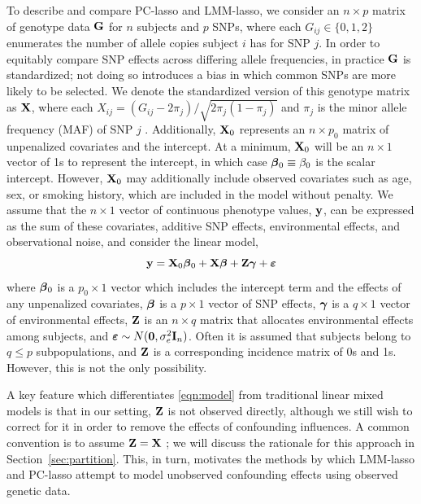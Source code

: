 To describe and compare PC-lasso and LMM-lasso, we consider an $n \times p$ matrix of genotype data $\mathbf{G}$ for $n$ subjects and $p$ SNPs, where each $G_{ij} \in \{ 0, 1, 2 \}$ enumerates the number of allele copies subject $i$ has for SNP $j$. In order to equitably compare SNP effects across differing allele frequencies, in practice $\mathbf{G}$ is standardized; not doing so introduces a bias in which common SNPs are more likely to be selected. We denote the standardized version of this genotype matrix as $\mathbf{X}$, where each $X_{ij} = (G_{ij} - 2 \pi_j) / \sqrt{2\pi_j (1 - \pi_j)}$ and $\pi_j$ is the minor allele frequency (MAF) of SNP $j$ \citep{zhang2015principal, price2006principal}. Additionally, $\mathbf{X}_0$ represents an $n \times p_0$ matrix of unpenalized covariates and the intercept. At a minimum, $\mathbf{X}_0$ will be an $n \times 1$ vector of 1s to represent the intercept, in which case $\boldsymbol{\beta}{}_0 \equiv \beta_0$ is the scalar intercept. However, $\mathbf{X}_0$ may additionally include observed covariates such as age, sex, or smoking history, which are included in the model without penalty. We assume that the $n \times 1$ vector of continuous phenotype values, $\mathbf{y}$, can be expressed as the sum of these covariates, additive SNP effects, environmental effects, and observational noise, and consider the linear model,
\begin{equation}
    \label{eqn:model}
    \mathbf{y} = \mathbf{X}_0 \boldsymbol{\beta}{}_0 + \mathbf{X}\boldsymbol{\beta}{} + \mathbf{Z}\boldsymbol{\gamma} + \boldsymbol{\varepsilon}{}
\end{equation}
where $\boldsymbol{\beta}{}_0$ is a $p_0 \times 1$ vector which includes the intercept term and the effects of any unpenalized covariates, $\boldsymbol{\beta}{}$ is a $p \times 1$ vector of SNP effects, $\boldsymbol{\gamma}$ is a $q \times 1$ vector of environmental effects, $\mathbf{Z}$ is an $n \times q$ matrix that allocates environmental effects among subjects, and $\boldsymbol{\varepsilon}{} \sim N(\boldsymbol{0}, \sigma^2_e \mathbf{I}_n)$. Often it is assumed that subjects belong to $q \le p$ subpopulations, and $\mathbf{Z}$ is a corresponding incidence matrix of 0s and 1s. However, this is not the only possibility.

A key feature which differentiates \eqref{eqn:model} from traditional linear mixed models is that in our setting, $\mathbf{Z}$ is not observed directly, although we still wish to correct for it in order to remove the effects of confounding influences. A common convention is to assume $\mathbf{Z} = \mathbf{X}$ \citep{wang2018multiplex, lippert2011fast, yang2014advantages}; we will discuss the rationale for this approach in Section~\ref{sec:partition}.  This, in turn, motivates the methods by which LMM-lasso and PC-lasso attempt to model unobserved confounding effects using observed genetic data.

